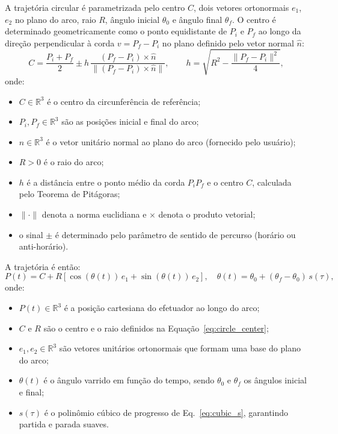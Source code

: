 A trajetória circular é parametrizada pelo centro $C$, dois vetores ortonormais $e_1$, $e_2$ no plano do arco, raio $R$, ângulo inicial $\theta_0$ e ângulo final $\theta_f$. O centro é determinado geometricamente como o ponto equidistante de $P_i$ e $P_f$ ao longo da direção perpendicular à corda $v = P_f - P_i$ no plano definido pelo vetor normal $\hat{n}$:
\begin{equation}
    C = \frac{P_i + P_f}{2} \pm h\,\frac{(P_f - P_i) \times \hat{n}}{\|(P_f - P_i) \times \hat{n}\|}, \qquad
    h = \sqrt{R^2 - \frac{\|P_f - P_i\|^2}{4}},
    \label{eq:circle_center}
\end{equation}
onde:
\begin{itemize}
    \item $C \in \mathbb{R}^3$ é o centro da circunferência de referência;
    \item $P_i, P_f \in \mathbb{R}^3$ são as posições inicial e final do arco;
    \item $\hat{n} \in \mathbb{R}^3$ é o vetor unitário normal ao plano do arco (fornecido pelo usuário);
    \item $R > 0$ é o raio do arco;
    \item $h$ é a distância entre o ponto médio da corda $P_i P_f$ e o centro $C$, calculada pelo Teorema de Pitágoras;
    \item $\|\cdot\|$ denota a norma euclidiana e $\times$ denota o produto vetorial;
    \item o sinal $\pm$ é determinado pelo parâmetro de sentido de percurso (horário ou anti-horário).
\end{itemize}

A trajetória é então:
\begin{equation}
    P(t) = C + R\left[\cos(\theta(t))\,e_1 + \sin(\theta(t))\,e_2\right], \quad
    \theta(t) = \theta_0 + (\theta_f - \theta_0)\,s(\tau),
    \label{eq:circle_traj}
\end{equation}
onde:
\begin{itemize}
    \item $P(t) \in \mathbb{R}^3$ é a posição cartesiana do efetuador ao longo do arco;
    \item $C$ e $R$ são o centro e o raio definidos na Equação~\eqref{eq:circle_center};
    \item $e_1, e_2 \in \mathbb{R}^3$ são vetores unitários ortonormais que formam uma base do plano do arco;
    \item $\theta(t)$ é o ângulo varrido em função do tempo, sendo $\theta_0$ e $\theta_f$ os ângulos inicial e final;
    \item $s(\tau)$ é o polinômio cúbico de progresso de Eq.~\eqref{eq:cubic_s}, garantindo partida e parada suaves.
\end{itemize}

